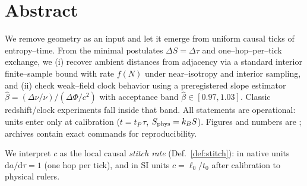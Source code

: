 \section*{Abstract}
We remove geometry as an input and let it emerge from uniform causal ticks of entropy--time.
From the minimal postulates $\Delta S = \Delta\tau$ and one--hop--per--tick exchange, we (i) recover ambient
distances from adjacency via a standard interior finite--sample bound with rate $f(N)$ under near--isotropy and
interior sampling, and (ii) check weak--field clock behavior using a preregistered slope estimator
$\hat\beta = (\Delta\nu/\nu)/(\Delta\Phi/c^2)$ with acceptance band $\hat\beta\in[0.97,1.03]$.
Classic redshift/clock experiments fall inside that band. All statements are operational: units enter only at
calibration ($t=t_P\,\tau$, $S_{\rm phys}=k_B S$). Figures and numbers are ; archives
contain exact commands for reproducibility.

We interpret $c$ as the local causal \emph{stitch rate} (Def.~\ref{def:stitch}): in native units $\mathrm{d}a/\mathrm{d}\tau=1$ (one hop per tick), and in SI units $c=\ell_0/t_0$ after calibration to physical rulers.